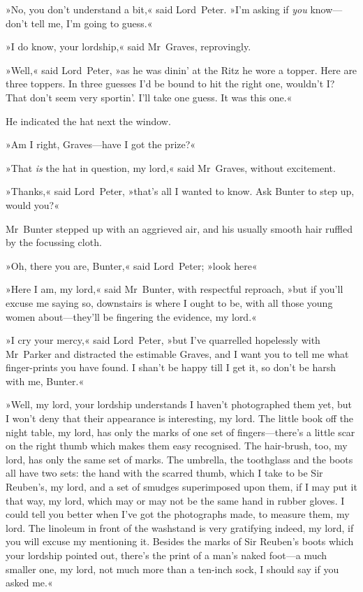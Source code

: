 »No, you don't understand a bit,« said Lord~Peter. »I'm asking if \textit{you} know—don't tell me, I'm going to guess.«

»I do know, your lordship,« said Mr~Graves, reprovingly.

»Well,« said Lord~Peter, »as he was dinin' at the Ritz he wore a topper. Here are three toppers. In three guesses I'd be bound to hit the right one, wouldn't I\@? That don't seem very sportin'. I'll take one guess. It was this one.«

He indicated the hat next the window.

»Am I right, Graves—have I got the prize?«

»That \textit{is} the hat in question, my lord,« said Mr~Graves, without excitement.

»Thanks,« said Lord~Peter, »that's all I wanted to know. Ask Bunter to step up, would you?«

Mr~Bunter stepped up with an aggrieved air, and his usually smooth hair ruffled by the focussing cloth.

»Oh, there you are, Bunter,« said Lord~Peter; »look here\longdash«

»Here I am, my lord,« said Mr~Bunter, with respectful reproach, »but if you'll excuse me saying so, downstairs is where I ought to be, with all those young women about—they'll be fingering the evidence, my lord.«

»I cry your mercy,« said Lord~Peter, »but I've quarrelled hopelessly with Mr~Parker and distracted the estimable Graves, and I want you to tell me what finger-prints you have found. I shan't be happy till I get it, so don't be harsh with me, Bunter.«

»Well, my lord, your lordship understands I haven't photographed them yet, but I won't deny that their appearance is interesting, my lord. The little book off the night table, my lord, has only the marks of one set of fingers—there's a little scar on the right thumb which makes them easy recognised. The hair-brush, too, my lord, has only the same set of marks. The umbrella, the toothglass and the boots all have two sets: the hand with the scarred thumb, which I take to be Sir Reuben's, my lord, and a set of smudges superimposed upon them, if I may put it that way, my lord, which may or may not be the same hand in rubber gloves. I could tell you better when I've got the photographs made, to measure them, my lord. The linoleum in front of the washstand is very gratifying indeed, my lord, if you will excuse my mentioning it. Besides the marks of Sir Reuben's boots which your lordship pointed out, there's the print of a man's naked foot—a much smaller one, my lord, not much more than a ten-inch sock, I should say if you asked me.«

